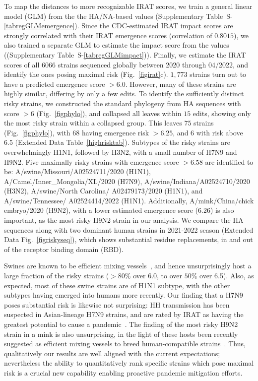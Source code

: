 \documentclass[onecolumn, compsoc,10pt]{IEEEtran}
\def\EXTENDED{Extended Data\xspace}
\def\SUPPLEMENTARY{Supplementary\xspace}
\begin{document}
To map the \enet distances to  more recognizable IRAT scores, we  train a general linear model (GLM)  from the  the HA/NA-based \erisk values (\SUPPLEMENTARY Table~S-\ref{tabregGLMemergence}). Since the CDC-estimated IRAT impact scores are strongly correlated with their IRAT emergence scores (correlation of $0.8015$), we also trained a separate GLM to estimate the impact score from the \erisk values ((\SUPPLEMENTARY Table~S-\ref{tabregGLMimpact})).  Finally,  we estimate the  IRAT scores of all  $6066$  \infl strains sequenced globally between 2020 through 04/2022, and identify the ones posing maximal risk (Fig.~\ref{figirat}c). $1,773$ strains turn out to have a predicted emergence score $>6.0$. However, many of these strains are highly similar, differing by only a few edits. To identify the sufficiently distinct risky strains, we constructed the standard phylogeny from  HA sequences with score $>6$ (Fig.~\ref{figphylo}), and collapsed all leaves within $15$ edits, showing only the most risky strain within a collapsed group. This leaves $75$ strains (Fig.~\ref{figphylo}), with $68$ having emergence risk $>6.25$, and $6$ with  risk above $6.5$ (\EXTENDED Table~\ref{highrisktab}). Subtypes of the   risky strains are overwhelmingly H1N1, followed by H3N2, with a  small number of H7N9 and H9N2. Five maximally risky strains with emergence score $>6.58$ are identified to be: 
A/swine/Missouri/A02524711/2020 (H1N1), A/Camel/Inner\_Mongolia/XL/2020 (H7N9), A/swine/Indiana/A02524710/2020 (H3N2), A/swine/North Carolina/ A02479173/2020 (H1N1), and A/swine/Tennessee/ A02524414/2022 (H1N1).  Additionally,  A/mink/China/chick embryo/2020 (H9N2),  with a lower estimated emergence score ($6.26$) is also important, as the most risky H9N2 strain in our analysis. We compare the HA sequences along with two dominant human strains in 2021-2022 season (\EXTENDED Fig.~\ref{figriskyseq}), which shows substantial residue replacements, in and out of the receptor binding domain (RBD).


Swines are known to be efficient mixing vessels~\cite{ma2009pig,nelson2018origins,reid2003origin,Baumann}, and hence unsurprisingly host a large fraction of the risky strains ($>80\%$ over 6.0, to over $50\%$ over 6.5). Also, as  expected, most of these swine strains are of  H1N1 subtype, with the other subtypes  having emerged into humans more recently. Our finding that a H7N9 poses substantial risk is likewise not surprising:
HH transmission has been suspected in Asian-lineage H7N9 strains, and are rated by IRAT as having the greatest potential to cause a pandemic~\cite{qi2013probable}. The finding of  the most risky H9N2 strain in a mink is also unsurprising, in the light of these hosts  been recently suggested as efficient mixing vessels to breed human-compatible strains~\cite{sun2021mink}. Thus,  qualitatively our results  are well aligned with the current expectations; nevertheless the ability to quantitatively rank  specific strains which pose maximal risk is a crucial new capability enabling proactive pandemic mitigation efforts.
\end{document}
